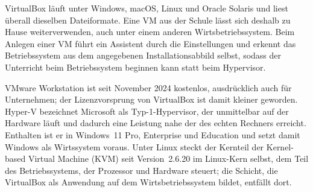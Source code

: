 VirtualBox läuft unter Windows, macOS, Linux und Oracle Solaris und liest überall dieselben Dateiformate. Eine VM aus der Schule lässt sich deshalb zu Hause weiterverwenden, auch unter einem anderen Wirtsbetriebssystem. Beim Anlegen einer VM führt ein Assistent durch die Einstellungen und erkennt das Betriebssystem aus dem angegebenen Installationsabbild selbst, sodass der Unterricht beim Betriebssystem beginnen kann statt beim Hypervisor.

VMware Workstation ist seit November 2024 kostenlos, ausdrücklich auch für Unternehmen; der Lizenzvorsprung von VirtualBox ist damit kleiner geworden. Hyper-V bezeichnet Microsoft als Typ-1-Hypervisor, der unmittelbar auf der Hardware läuft und dadurch eine Leistung nahe der des echten Rechners erreicht. Enthalten ist er in Windows~11 Pro, Enterprise und Education und setzt damit Windows als Wirtssystem voraus. Unter Linux steckt der Kernteil der Kernel-based Virtual Machine (KVM) seit Version~2.6.20 im Linux-Kern selbst, dem Teil des Betriebssystems, der Prozessor und Hardware steuert; die Schicht, die VirtualBox als Anwendung auf dem Wirtsbetriebssystem bildet, entfällt dort.

